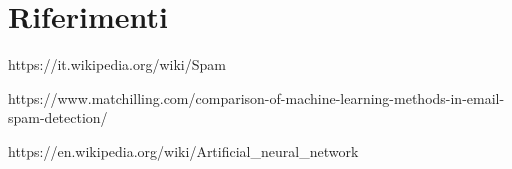 \section*{Riferimenti}
https://it.wikipedia.org/wiki/Spam

https://www.matchilling.com/comparison-of-machine-learning-methods-in-email-spam-detection/

https://en.wikipedia.org/wiki/Artificial\_neural\_network 

